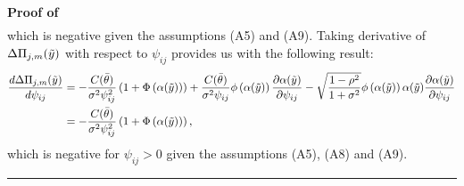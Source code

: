 \documentclass[12pt]{article}
\newenvironment{proof}[1][Proof of]{\noindent\textbf{#1} }{\ \rule{0.5em}{0.5em}}
\begin{document}
\begin{proof}
\begin{equation*}
\begin{aligned}
        \end{aligned}
    \end{equation*}
    which is negative given the assumptions (A5) and (A9). Taking derivative of $\Delta\Pi_{j,m}(\Tilde{y})$ with respect to $\psi_{ij}$ provides us with the following result:
    \begin{equation*}
        \begin{aligned}
            \frac{d\Delta\Pi_{j,m}(\Tilde{y})}{d\psi_{ij}} & 
            = -\frac{C(\bar{\theta})}{\sigma^2 \psi^2_{ij}} \left(1+\Phi\left(\alpha(\Tilde{y})\right)\right)
            + \frac{C(\bar{\theta})}{\sigma^2 \psi_{ij}}\phi\left(\alpha(\Tilde{y})\right)\frac{\partial \alpha(\Tilde{y})}{\partial \psi_{ij}}
            - \sqrt{\frac{1-\rho^2}{1+\sigma^2}}\phi\left(\alpha(\Tilde{y})\right)\alpha(\Tilde{y})\frac{\partial \alpha(\Tilde{y})}{\partial \psi_{ij}}\\
            & = -\frac{C(\bar{\theta})}{\sigma^2 \psi^2_{ij}} \left(1+\Phi\left(\alpha(\Tilde{y})\right)\right),
        \end{aligned}
    \end{equation*}
    which is negative for $\psi_{ij} >0$ given the assumptions (A5), (A8) and (A9). 
\end{proof}
\end{document}
